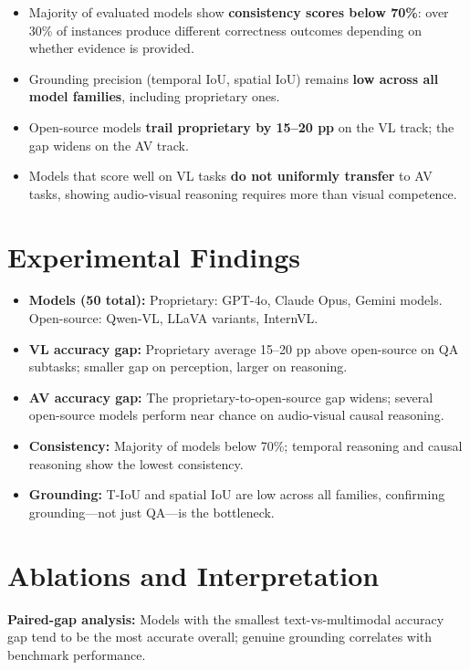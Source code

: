 \documentclass[10pt,twocolumn]{article}
\begin{document}
\begin{itemize}[itemsep=2pt,parsep=0pt]
  \item Majority of evaluated models show \textbf{consistency scores
    below 70\%}: over 30\% of instances produce different correctness
    outcomes depending on whether evidence is provided.
  \item Grounding precision (temporal IoU, spatial IoU) remains
    \textbf{low across all model families}, including proprietary ones.
  \item Open-source models \textbf{trail proprietary by 15--20 pp} on
    the VL track; the gap widens on the AV track.
  \item Models that score well on VL tasks \textbf{do not uniformly
    transfer} to AV tasks, showing audio-visual reasoning requires more
    than visual competence.
\end{itemize}

\section{Experimental Findings}

\begin{itemize}[itemsep=2pt,parsep=0pt]
  \item \textbf{Models (50 total):} Proprietary: GPT-4o, Claude Opus,
    Gemini models. Open-source: Qwen-VL, LLaVA variants, InternVL.
  \item \textbf{VL accuracy gap:} Proprietary average 15--20 pp above
    open-source on QA subtasks; smaller gap on perception, larger on
    reasoning.
  \item \textbf{AV accuracy gap:} The proprietary-to-open-source gap
    widens; several open-source models perform near chance on
    audio-visual causal reasoning.
  \item \textbf{Consistency:} Majority of models below 70\%; temporal
    reasoning and causal reasoning show the lowest consistency.
  \item \textbf{Grounding:} T-IoU and spatial IoU are low across all
    families, confirming grounding---not just QA---is the bottleneck.
\end{itemize}

\section{Ablations and Interpretation}

\textbf{Paired-gap analysis:} Models with the smallest text-vs-multimodal
accuracy gap tend to be the most accurate overall; genuine grounding
correlates with benchmark performance.
\end{document}
